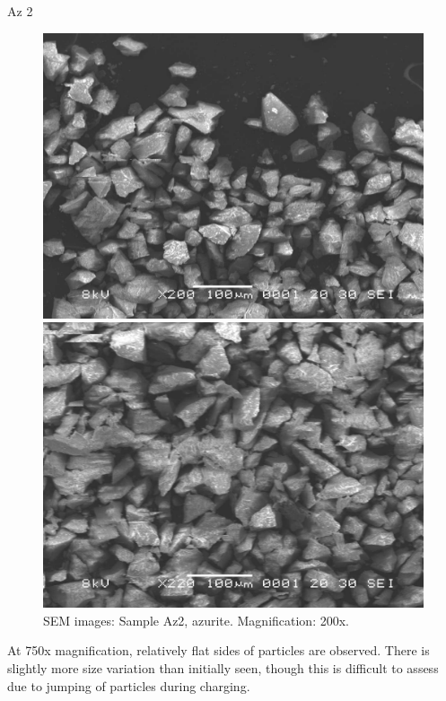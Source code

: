 Az 2

\begin{figure}[H]
\centering
\begin{minipage}{.45\textwidth}
  \centering
  \includegraphics[width=\linewidth]{Az2_x200_1_240221}
\end{minipage}
\begin{minipage}{.45\textwidth}
  \centering
  \includegraphics[width=\linewidth]{Az2_x200_2_240221}
\end{minipage}
\caption[SEM images: Sample Az2, azurite]{SEM images: Sample Az2, azurite. Magnification: 200x.}
\label{fig:az2_sem_1}
\end{figure}

At 750x magnification, relatively flat sides of particles are observed. There is slightly more size variation than initially seen, though this is difficult to assess due to jumping of particles during charging.

